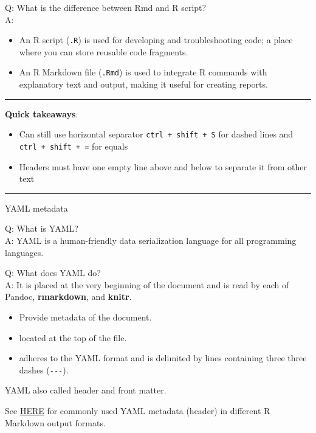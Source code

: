 \documentclass[
]{book}
\providecommand{\tightlist}{%
  \setlength{\itemsep}{0pt}\setlength{\parskip}{0pt}}
\theoremstyle{definition}
\theoremstyle{definition}
\theoremstyle{definition}
\theoremstyle{definition}
\theoremstyle{remark}
\begin{document}
Q: What is the difference between Rmd and R script?\\
A:

\begin{itemize}
\tightlist
\item
  An R script (\texttt{.R}) is used for developing and troubleshooting code; a place where you can store reusable code fragments.
\item
  An R Markdown file (\texttt{.Rmd}) is used to integrate R commands with explanatory text and output, making it useful for creating reports.
\end{itemize}

\begin{center}\rule{0.5\linewidth}{0.5pt}\end{center}

\textbf{Quick takeaways}:

\begin{itemize}
\tightlist
\item
  Can still use horizontal separator \texttt{ctrl\ +\ shift\ +\ S} for dashed lines and \texttt{ctrl\ +\ shift\ +\ =} for equals
\item
  Headers must have one empty line above and below to separate it from other text
\end{itemize}

\begin{center}\rule{0.5\linewidth}{0.5pt}\end{center}

YAML metadata

Q: What is YAML?\\
A: YAML is a human-friendly data serialization language for all programming languages.

Q: What does YAML do?\\
A: It is placed at the very beginning of the document and is read by each of Pandoc, \textbf{rmarkdown}, and \textbf{knitr}.

\begin{itemize}
\tightlist
\item
  Provide metadata of the document.
\item
  located at the top of the file.
\item
  adheres to the YAML format and is delimited by lines containing three three dashes (\texttt{-\/-\/-}).
\end{itemize}

YAML also called header and front matter.

See \href{https://github.com/hao203/rmarkdown-YAML.git}{HERE} for commonly used YAML metadata (header) in different R Markdown output formats.
\end{document}

